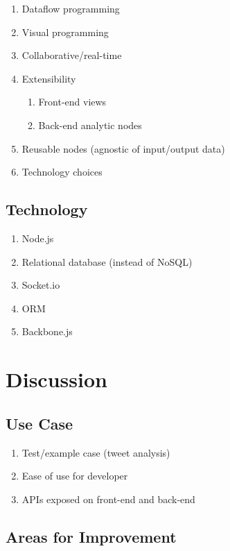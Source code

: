 \documentclass[midd]{thesis}
\begin{document}
  \begin{enumerate}
    \item Dataflow programming
    \item Visual programming
    \item Collaborative/real-time
    \item Extensibility
    \begin{enumerate}
      \item Front-end views
      \item Back-end analytic nodes
    \end{enumerate}
    \item Reusable nodes (agnostic of input/output data)
    \item Technology choices
  \end{enumerate}

\section{Technology}
  \begin{enumerate}
    \item Node.js
    \item Relational database (instead of NoSQL)
    \item Socket.io
    \item ORM
    \item Backbone.js
  \end{enumerate}

\chapter{Discussion}

\section{Use Case}

\begin{enumerate}
  \item Test/example case (tweet analysis)
  \item Ease of use for developer
  \item APIs exposed on front-end and back-end
\end{enumerate}

\section{Areas for Improvement}
\end{document}
